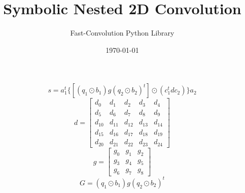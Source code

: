 \documentclass{article}%
\title{Symbolic Nested 2D Convolution}%
\author{Fast{-}Convolution Python Library}%
\date{\today}%
\begin{document}
%
\normalsize%
\maketitle%
\[%
s=a_1^t \{[(q_1 \odot b_1) g (q_2 \odot b_2)^t] \odot (c_1^t d c_2)\}a_2%
\]%
\[%
d = \left[\begin{matrix}d_{0} & d_{1} & d_{2} & d_{3} & d_{4}\\d_{5} & d_{6} & d_{7} & d_{8} & d_{9}\\d_{10} & d_{11} & d_{12} & d_{13} & d_{14}\\d_{15} & d_{16} & d_{17} & d_{18} & d_{19}\\d_{20} & d_{21} & d_{22} & d_{23} & d_{24}\end{matrix}\right]%
\]%
\[%
g = \left[\begin{matrix}g_{0} & g_{1} & g_{2}\\g_{3} & g_{4} & g_{5}\\g_{6} & g_{7} & g_{8}\end{matrix}\right]%
\]%
\[%
G = (q_1 \odot b_1) g (q_2 \odot b_2)^t%
\]%
\end{document}
